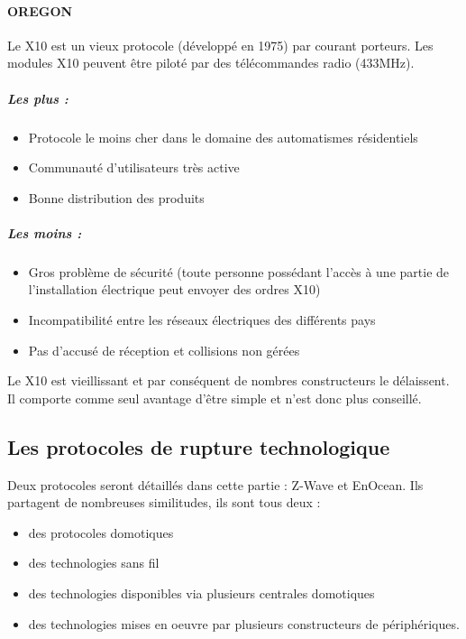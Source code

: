 \documentclass[a4paper,10pt]{article}
\begin{document}
\paragraph{OREGON}
Le X10 est un vieux protocole (développé en 1975) par courant porteurs.  Les modules X10 peuvent être piloté par des télécommandes radio (433MHz). 

\subparagraph{Les plus :}
\begin{itemize}
\item Protocole le moins cher dans le domaine des automatismes résidentiels
\item Communauté d'utilisateurs très active
\item Bonne distribution des produits
\end{itemize}
\subparagraph{Les moins :}
\begin{itemize}
\item Gros problème de sécurité (toute personne possédant l'accès à une partie de l'installation électrique peut envoyer des ordres X10)
\item Incompatibilité entre les réseaux électriques des différents pays
\item Pas d'accusé de réception et collisions non gérées
\end{itemize}

Le X10 est vieillissant et par conséquent de nombres constructeurs le délaissent. Il comporte comme seul avantage d'être simple et n'est donc plus conseillé.
\subsection{Les protocoles de rupture technologique}
Deux protocoles seront détaillés dans cette partie : Z-Wave et EnOcean. Ils partagent de nombreuses similitudes, ils sont tous deux :
\begin{itemize}
\item des protocoles domotiques
\item des technologies sans fil
\item des technologies disponibles via plusieurs centrales domotiques
\item des technologies mises en oeuvre par plusieurs constructeurs de périphériques.

\end{itemize}
\end{document}
